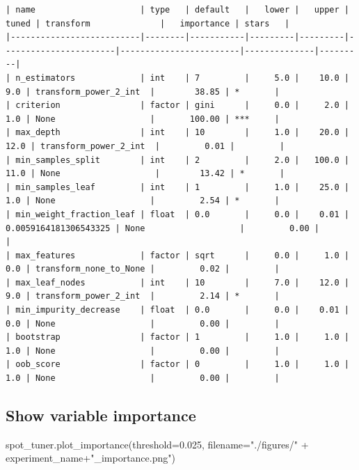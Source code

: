 \documentclass[
  letterpaper,
  DIV=11,
  numbers=noendperiod]{scrreprt}
\newenvironment{Shaded}{\begin{snugshade}}{\end{snugshade}}
\newcommand{\FloatTok}[1]{\textcolor[rgb]{0.68,0.00,0.00}{#1}}
\newcommand{\NormalTok}[1]{\textcolor[rgb]{0.00,0.23,0.31}{#1}}
\newcommand{\OperatorTok}[1]{\textcolor[rgb]{0.37,0.37,0.37}{#1}}
\newcommand{\StringTok}[1]{\textcolor[rgb]{0.13,0.47,0.30}{#1}}
\begin{document}
\begin{verbatim}
| name                     | type   | default   |   lower |   upper |                 tuned | transform              |   importance | stars   |
|--------------------------|--------|-----------|---------|---------|-----------------------|------------------------|--------------|---------|
| n_estimators             | int    | 7         |     5.0 |    10.0 |                   9.0 | transform_power_2_int  |        38.85 | *       |
| criterion                | factor | gini      |     0.0 |     2.0 |                   1.0 | None                   |       100.00 | ***     |
| max_depth                | int    | 10        |     1.0 |    20.0 |                  12.0 | transform_power_2_int  |         0.01 |         |
| min_samples_split        | int    | 2         |     2.0 |   100.0 |                  11.0 | None                   |        13.42 | *       |
| min_samples_leaf         | int    | 1         |     1.0 |    25.0 |                   1.0 | None                   |         2.54 | *       |
| min_weight_fraction_leaf | float  | 0.0       |     0.0 |    0.01 | 0.0059164181306543325 | None                   |         0.00 |         |
| max_features             | factor | sqrt      |     0.0 |     1.0 |                   0.0 | transform_none_to_None |         0.02 |         |
| max_leaf_nodes           | int    | 10        |     7.0 |    12.0 |                   9.0 | transform_power_2_int  |         2.14 | *       |
| min_impurity_decrease    | float  | 0.0       |     0.0 |    0.01 |                   0.0 | None                   |         0.00 |         |
| bootstrap                | factor | 1         |     1.0 |     1.0 |                   1.0 | None                   |         0.00 |         |
| oob_score                | factor | 0         |     1.0 |     1.0 |                   1.0 | None                   |         0.00 |         |
\end{verbatim}

\hypertarget{show-variable-importance-1}{%
\subsection{Show variable importance}\label{show-variable-importance-1}}

\begin{Shaded}
\begin{Highlighting}[]
\NormalTok{spot\_tuner.plot\_importance(threshold}\OperatorTok{=}\FloatTok{0.025}\NormalTok{, filename}\OperatorTok{=}\StringTok{"./figures/"} \OperatorTok{+}\NormalTok{ experiment\_name}\OperatorTok{+}\StringTok{"\_importance.png"}\NormalTok{)}
\end{Highlighting}
\end{Shaded}
\end{document}
